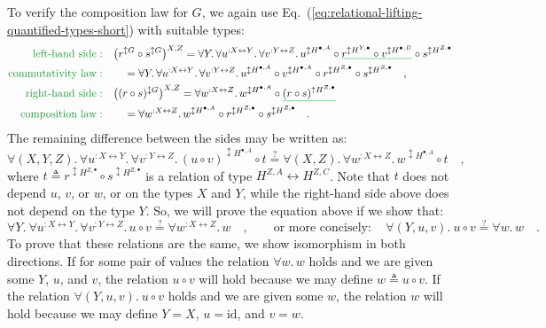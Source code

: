 To verify the composition law for $G$, we again use Eq.~(\ref{eq:relational-lifting-quantified-types-short})
with suitable types:
\begin{align*}
{\color{greenunder}\text{left-hand side}:}\quad & \big(r^{\updownarrow G}\circ s^{\updownarrow G}\big)^{X,Z}=\forall Y.\,\forall u^{:X\leftrightarrow Y}.\,\forall v^{:Y\leftrightarrow Z}.\,u^{\updownarrow H^{\bullet,A}}\circ\gunderline{r^{\updownarrow H^{Y,\bullet}}\circ v^{\updownarrow H^{\bullet,B}}}\circ s^{\updownarrow H^{Z,\bullet}}\\
{\color{greenunder}\text{commutativity law}:}\quad & \quad=\forall Y.\,\forall u^{:X\leftrightarrow Y}.\,\forall v^{:Y\leftrightarrow Z}.\,u^{\updownarrow H^{\bullet,A}}\circ v^{\updownarrow H^{\bullet,A}}\circ r^{\updownarrow H^{Z,\bullet}}\circ s^{\updownarrow H^{Z,\bullet}}\quad,\\
{\color{greenunder}\text{right-hand side}:}\quad & \big((r\circ s)^{\updownarrow G}\big)^{X,Z}=\forall w^{:X\leftrightarrow Z}.\,w^{\updownarrow H^{\bullet,A}}\circ\gunderline{(r\circ s)^{\uparrow H^{Z,\bullet}}}\\
{\color{greenunder}\text{composition law}:}\quad & \quad=\forall w^{:X\leftrightarrow Z}.\,w^{\updownarrow H^{\bullet,A}}\circ r^{\updownarrow H^{Z,\bullet}}\circ s^{\updownarrow H^{Z,\bullet}}\quad.
\end{align*}
The remaining difference between the sides may be written as:
\[
\forall(X,Y,Z).\,\forall u^{:X\leftrightarrow Y}.\,\forall v^{:Y\leftrightarrow Z}.\,(u\circ v)^{\updownarrow H^{\bullet,A}}\circ t\overset{?}{=}\forall(X,Z).\,\forall w^{:X\leftrightarrow Z}.\,w^{\updownarrow H^{\bullet,A}}\circ t\quad,
\]
where $t\triangleq r^{\updownarrow H^{Z,\bullet}}\circ s^{\updownarrow H^{Z,\bullet}}$
is a relation of type $H^{Z,A}\leftrightarrow H^{Z,C}$. Note that
$t$ does not depend $u$, $v$, or $w$, or on the types $X$ and
$Y$, while the right-hand side above does not depend on the type
$Y$. So, we will prove the equation above if we show that:
\[
\forall Y.\ \forall u^{:X\leftrightarrow Y}.\,\forall v^{:Y\leftrightarrow Z}.\,u\circ v\overset{?}{=}\forall w^{:X\leftrightarrow Z}.\,w\quad,\quad\quad\text{or more concisely}:\quad\forall(Y,u,v).\:u\circ v\overset{?}{=}\forall w.\,w\quad.
\]
To prove that these relations are the same, we show isomorphism in
both directions. If for some pair of values the relation $\forall w.\,w$
holds and we are given some $Y$, $u$, and $v$, the relation $u\circ v$
will hold because we may define $w\triangleq u\circ v$. If the relation
$\forall(Y,u,v).\:u\circ v$ holds and we are given some $w$, the
relation $w$ will hold because we may define $Y=X$, $u=\text{id}$,
and $v=w$. 

